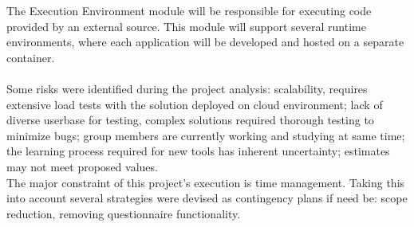 The Execution Environment module will be responsible for executing code provided by an external source. This module will support several runtime environments, where each application will be developed and hosted on a separate container.
\\
\\
Some risks were identified during the project analysis: scalability, requires extensive load tests with the solution deployed on cloud environment; lack of diverse userbase for testing, complex solutions required thorough testing to minimize bugs; group members are currently working and studying at same time; the learning process required for new tools has inherent uncertainty; estimates may not meet proposed values.
\\
The major constraint of this project's execution is time management. Taking this into account several strategies were devised as contingency plans if need be: scope reduction, removing questionnaire functionality.